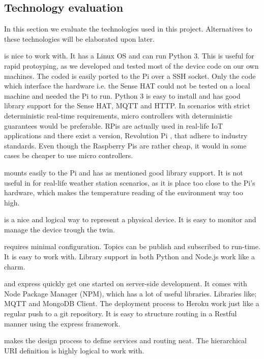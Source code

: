 \subsection*{Technology evaluation}
In this section we evaluate the technologies used in this project. Alternatives to these technologies will be elaborated upon later.
\begin{description}[style=unboxed,leftmargin=0cm]
    \item[Raspberry Pi] is nice to work with. It has a Linux OS and can run Python 3. This is useful for rapid protoyping, as we developed and tested most of the device code on our own machines. The coded is easily ported to the Pi over a SSH socket. Only the code which interface the hardware i.e. the Sense HAT could not be tested on a local machine and needed the Pi to run. Python 3 is easy to install and has good library support for the Sense HAT, MQTT and HTTP.  In scenarios with strict deterministic real-time requirements, micro controllers with deterministic guarantees would be preferable. RPis are actually used in real-life IoT applications and there exist a version, Revolution Pi \cite{revolution}, that adhere to industry standards. Even though the Raspberry Pis are rather cheap, it would in some cases be cheaper to use micro controllers. 
    \item[Sense HAT] mounts easily to the Pi and has as mentioned good library support. It is not useful in for real-life weather station scenarios, as it is place too close to the Pi's hardware, which makes the temperature reading of the environment way too high.
    \item[Device Twin] is a nice and logical way to represent a physical device. It is easy to monitor and manage the device trough the twin.  
    \item[MQTT] requires minimal configuration. Topics can be publish and subscribed to run-time. It is easy to work with. Library support in both Python and Node.js work like a charm. 
    \item[Node.js] and express quickly get one started on server-side development. It comes with Node Package Manager (NPM), which has a lot of useful libraries. Libraries like; MQTT and MongoDB Client. The deployment process to Heroku work just like a regular push to a git repository. It is easy to structure routing in a Restful manner using the express framework.
    \item[REST] makes the design process to define services and routing neat. The hierarchical URI definition is highly logical to work with.  

\end{description}
